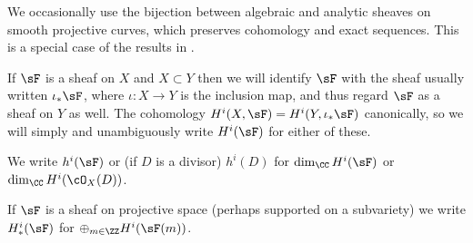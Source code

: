 We occasionally use the bijection between algebraic and analytic sheaves on smooth projective curves, which preserves
cohomology and exact sequences. This is a special case of the results in \cite{GAGA}. 

If $\sF$ is a sheaf on $X$ and $X\subset Y$ then we will identify $\sF$ with
the sheaf usually written $\iota_*\sF$, where $\iota:X\to Y$ is the inclusion map,
 and thus regard $\sF$ as a sheaf on $Y$ as well.
The cohomology  $H^i(X, \sF) = H^i(Y,\iota_*\sF)$ canonically, so we will
simply and unambiguously write $H^i(\sF)$ for either of these. 

We write $h^i(\sF)$ or (if $D$ is a divisor) $h^{i}(D)$ for 
$\dim_{\CC}H^i(\sF)$ or $\dim_{\CC}H^i(\cO_X(D))$. 

If $\sF$ is a sheaf on projective space (perhaps supported on a subvariety) we write $H^i_*(\sF)$ for
$\oplus_{m\in \ZZ} H^i(\sF(m))$. 





